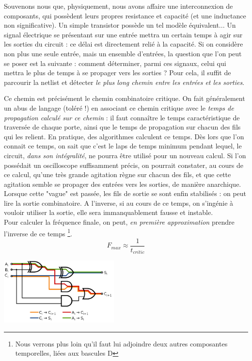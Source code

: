 Souvenons nous que, physiquement, nous avons affaire une interconnexion de composants, qui possèdent leurs propres resistance et capacité (et une inductance non significative). Un simple transistor possède un tel modèle équivalent...
Un signal électrique se présentant sur une entrée mettra un certain temps à agir sur les sorties du circuit : ce délai est directement relié à la capacité. Si on considère non plus une seule entrée, mais un ensemble d'entrées, la question que l'on peut se poser est la suivante : comment déterminer, parmi ces signaux, celui qui mettra le plus de temps
à se propager vers les sorties ? Pour cela, il suffit de parcourir la netlist et détecter {\it le plus long chemin entre les entrées et les sorties}.

Ce chemin est précisément le chemin combinatoire critique.
On fait généralement un abus de langage (toléré !) en associant ce chemin critique avec le {\it temps de propagation calculé sur ce chemin} : il faut connaître le temps caractéristique de traversée de chaque porte, ainsi que le temps de propagation sur chacun des fils qui les relient. En pratique,
des algorithmes calculent ce temps. Dès lors que l'on connait ce temps, on sait que c'est le laps de temps minimum pendant lequel, le circuit, {\it dans son intégralité}, ne pourra être utilisé pour un nouveau calcul. Si l'on possédait
un oscilloscope suffisamment précis, on pourrait constater, au cours de ce calcul, qu'une très grande agitation règne sur chacun des fils, et que cette agitation semble se propager des entrées vers les sorties, de manière anarchique.
Lorsque cette "vague" est passée, les fils de sortie se sont enfin stabilisés : on peut lire la sortie combinatoire. A l'inverse, si au cours de ce temps, on s'ingénie à vouloir utiliser la sortie, elle sera immanquablement fausse et instable.\\

Pour calculer la fréquence finale, on peut, {\it en première approximation} prendre l'inverse de ce temps \footnote{Nous verrons plus loin qu'il faut lui adjoindre deux autres composantes temporelles, liées aux bascules D}.
$$F_{max} \approx \frac{1}{t_{critic}}$$

\begin{center}
  \includegraphics[width=6cm]{./figures/chemin-critique.png}
\end{center}


